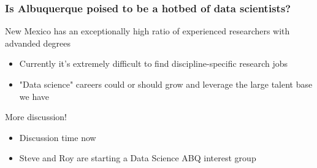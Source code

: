 
\begin{frame}
\frametitle{Is Albuquerque poised to be a hotbed of data scientists?}
\begin{center}

\begin{block}{New Mexico has an exceptionally high ratio of experienced researchers with advanded degrees}
\begin{itemize}
    \item Currently it's extremely difficult to find discipline-specific research jobs
	\item "Data science" careers could or should grow and leverage the large talent base we have 
\end{itemize}
\end{block}

\begin{exampleblock}{More discussion!}
\begin{itemize}
    \item Discussion time now
	\item Steve and Roy are starting a Data Science ABQ interest group
\end{itemize}
\end{exampleblock}



\end{center}
\end{frame}

